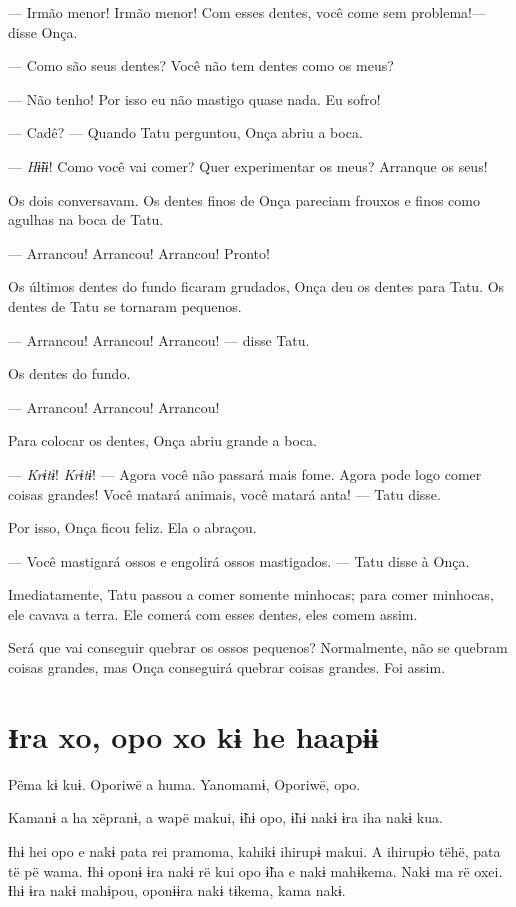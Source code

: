 --- Irmão menor! Irmão menor! Com esses dentes, você come sem
problema!--- disse Onça. 

--- Como são seus dentes? Você não tem dentes como os meus?

--- Não tenho! Por isso eu não mastigo quase nada. Eu sofro! 

--- Cadê? --- Quando Tatu perguntou, Onça abriu a boca. 

--- \textit{Hɨ̃ɨɨ}! Como você vai comer? Quer experimentar os meus? Arranque
os seus! 

Os dois conversavam. Os dentes finos de Onça pareciam frouxos e finos
como agulhas na boca de Tatu.

--- Arrancou! Arrancou! Arrancou! Pronto! 

Os últimos dentes do fundo ficaram grudados, Onça deu os dentes para
Tatu. Os dentes de Tatu se tornaram pequenos.

--- Arrancou! Arrancou! Arrancou! --- disse Tatu.

Os dentes do fundo. 

--- Arrancou! Arrancou! Arrancou! 

Para colocar os dentes, Onça abriu grande a boca. 

--- \textit{Krɨtɨ}! \textit{Krɨtɨ}! --- Agora você não passará mais fome. Agora pode logo
comer coisas grandes! Você matará animais, você matará anta! --- Tatu
disse. 

Por isso, Onça ficou feliz. Ela o abraçou. 

--- Você mastigará ossos e engolirá ossos mastigados. --- Tatu disse à
 Onça.

Imediatamente, Tatu  passou a comer somente minhocas; para comer minhocas, ele
 cavava a terra. Ele comerá com esses dentes, eles comem assim. 

Será que vai conseguir quebrar os ossos pequenos? Normalmente, não se
 quebram coisas grandes, mas Onça conseguirá quebrar coisas grandes.
 Foi assim. 
 
\chapter{Ɨra xo, opo xo kɨ he haapɨɨ}

 Pëma kɨ kuɨ. Oporiwë a huma. Yanomamɨ, Oporiwë, opo. 

Kamanɨ a ha xëpranɨ, a wapë makui, ɨ̃hɨ opo, ɨ̃hɨ nakɨ ɨra iha nakɨ kua.

Ɨhɨ hei opo e nakɨ pata rei pramoma, kahikɨ ihirupɨ makui. A ihirupɨo
tëhë, pata të pë wama. Ɨhɨ oponɨ ɨra nakɨ rë kui opo ɨ̃ha e nakɨ
mahɨkema. Nakɨ ma rë oxei. Ɨhɨ ɨra nakɨ mahɨpou, oponɨɨra nakɨ tɨkema,
kama nakɨ. 

